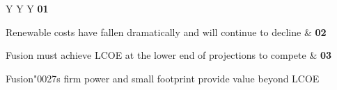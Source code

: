 \documentclass[10pt,a4paper]{article}
\newcommand{\BOApos}{{\BOQuoteFont\char"0027}}
\begin{document}
\vspace{5pt}\noindent\begin{tabularx}{\linewidth}{Y Y Y}
{\textcolor{BOGreen}{\bfseries 01}}\par{\scriptsize\color{BOText} Renewable costs have fallen dramatically and will continue to decline} & {\textcolor{BOGreen}{\bfseries 02}}\par{\scriptsize\color{BOText} Fusion must achieve LCOE at the lower end of projections to compete} & {\textcolor{BOGreen}{\bfseries 03}}\par{\scriptsize\color{BOText} Fusion\BOApos{}s firm power and small footprint provide value beyond LCOE} \\
\end{tabularx}\par\vspace{2pt}
\label{chap:6:end}
\end{document}
